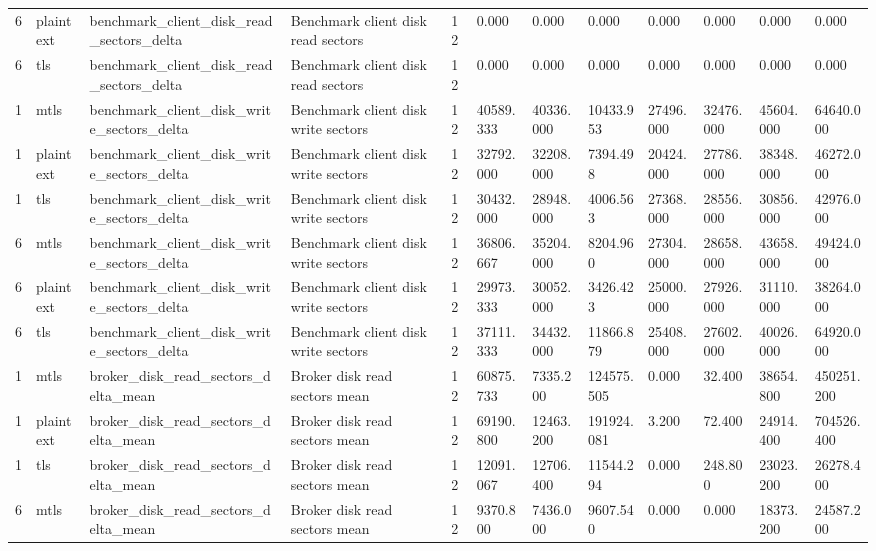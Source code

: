 \begin{longtable}{llllllllllll}
6 & plaintext & benchmark\_client\_disk\_read\_sectors\_delta & Benchmark client disk read sectors & 12 & 0.000 & 0.000 & 0.000 & 0.000 & 0.000 & 0.000 & 0.000 \\
6 & tls & benchmark\_client\_disk\_read\_sectors\_delta & Benchmark client disk read sectors & 12 & 0.000 & 0.000 & 0.000 & 0.000 & 0.000 & 0.000 & 0.000 \\
1 & mtls & benchmark\_client\_disk\_write\_sectors\_delta & Benchmark client disk write sectors & 12 & 40589.333 & 40336.000 & 10433.953 & 27496.000 & 32476.000 & 45604.000 & 64640.000 \\
1 & plaintext & benchmark\_client\_disk\_write\_sectors\_delta & Benchmark client disk write sectors & 12 & 32792.000 & 32208.000 & 7394.498 & 20424.000 & 27786.000 & 38348.000 & 46272.000 \\
1 & tls & benchmark\_client\_disk\_write\_sectors\_delta & Benchmark client disk write sectors & 12 & 30432.000 & 28948.000 & 4006.563 & 27368.000 & 28556.000 & 30856.000 & 42976.000 \\
6 & mtls & benchmark\_client\_disk\_write\_sectors\_delta & Benchmark client disk write sectors & 12 & 36806.667 & 35204.000 & 8204.960 & 27304.000 & 28658.000 & 43658.000 & 49424.000 \\
6 & plaintext & benchmark\_client\_disk\_write\_sectors\_delta & Benchmark client disk write sectors & 12 & 29973.333 & 30052.000 & 3426.423 & 25000.000 & 27926.000 & 31110.000 & 38264.000 \\
6 & tls & benchmark\_client\_disk\_write\_sectors\_delta & Benchmark client disk write sectors & 12 & 37111.333 & 34432.000 & 11866.879 & 25408.000 & 27602.000 & 40026.000 & 64920.000 \\
1 & mtls & broker\_disk\_read\_sectors\_delta\_mean & Broker disk read sectors mean & 12 & 60875.733 & 7335.200 & 124575.505 & 0.000 & 32.400 & 38654.800 & 450251.200 \\
1 & plaintext & broker\_disk\_read\_sectors\_delta\_mean & Broker disk read sectors mean & 12 & 69190.800 & 12463.200 & 191924.081 & 3.200 & 72.400 & 24914.400 & 704526.400 \\
1 & tls & broker\_disk\_read\_sectors\_delta\_mean & Broker disk read sectors mean & 12 & 12091.067 & 12706.400 & 11544.294 & 0.000 & 248.800 & 23023.200 & 26278.400 \\
6 & mtls & broker\_disk\_read\_sectors\_delta\_mean & Broker disk read sectors mean & 12 & 9370.800 & 7436.000 & 9607.540 & 0.000 & 0.000 & 18373.200 & 24587.200 \\

\end{longtable}

